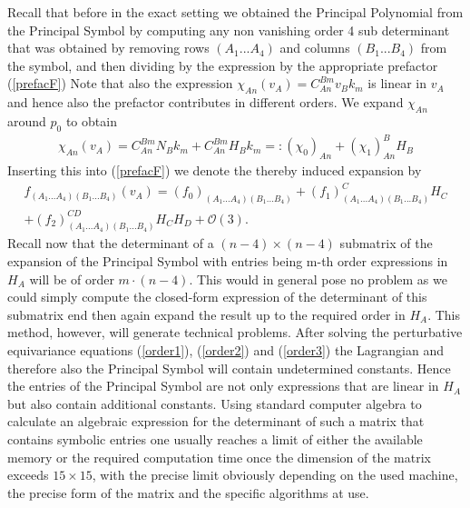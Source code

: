 \documentclass[a4paper,12pt, DIV=14, BCOR=5mm, twoside, headsepline, numbers=noenddot]{scrbook}
\begin{document}
Recall that before in the exact setting we obtained the Principal Polynomial from the Principal Symbol by computing any non vanishing order 4 sub determinant that was obtained by removing rows $(A_1...A_4)$ and columns $(B_1...B_4)$ from the symbol, and then dividing by the expression by the appropriate prefactor (\ref{prefacF})
Note that also the expression $\chi_{An}(v_A) = C_{An}^{Bm}v_Bk_m$ is linear in $v_A$ and hence also the prefactor contributes in different orders. We expand $\chi_{An}$ around $p_0$ to obtain
\begin{align}
\chi_{An}(v_A) =  C^{Bm}_{An} N_B k_m + C^{Bm}_{An} H_B k_m =: (\chi_0)_{An} + (\chi_1)^B_{An}H_B
\end{align}
Inserting this into (\ref{prefacF}) we denote the thereby induced expansion by
\begin{multline}\label{prefacExp}
    f_{(A_1...A_4)(B_1...B_4)}(v_A) = (f_0)_{(A_1...A_4)(B_1...B_4)} + (f_1)^C_{(A_1...A_4)(B_1...B_4)}H_C\\ + (f_2)^{CD}_{(A_1...A_4)(B_1...B_4)}H_CH_D
    + \mathcal{O}(3).
\end{multline}
Recall now that the determinant of a $(n-4) \times (n-4)$ submatrix of the expansion of the Principal Symbol with entries being m-th order expressions in $H_A$ will be of order $m\cdot(n-4)$. This would in general pose no problem as we could simply compute the closed-form expression of the determinant of this submatrix end then again expand the result up to the required order in $H_A$. This method, however, will generate technical problems. After solving the perturbative equivariance equations (\ref{order1}), (\ref{order2}) and (\ref{order3}) the Lagrangian and therefore also the Principal Symbol will contain undetermined constants. Hence the entries of the Principal Symbol are not only expressions that are linear in $H_A$ but also contain additional constants. Using standard computer algebra to calculate an algebraic expression for the determinant of such a matrix that contains symbolic entries one usually reaches a limit of either the available memory or the required computation time once the dimension of the matrix exceeds $15 \times 15 $, with the precise limit obviously depending on the used machine, the precise form of the matrix and the specific algorithms at use. 
\end{document}

